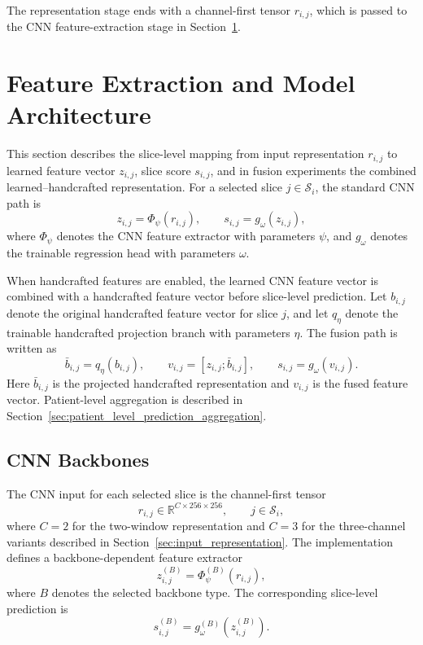 The representation stage ends with a channel-first tensor \(r_{i,j}\), which is passed to the CNN feature-extraction stage in Section~\ref{sec:feature_extraction_model_architecture}.


\section{Feature Extraction and Model Architecture}
\label{sec:feature_extraction_model_architecture}

This section describes the slice-level mapping from input representation \(r_{i,j}\) to learned feature vector \(z_{i,j}\), slice score \(s_{i,j}\), and in fusion experiments the combined learned--handcrafted representation. For a selected slice \(j \in \mathcal{S}_i\), the standard CNN path is
\[
z_{i,j}
=
\Phi_{\psi}(r_{i,j}),
\qquad
s_{i,j}
=
g_{\omega}(z_{i,j}),
\]
where \(\Phi_{\psi}\) denotes the CNN feature extractor with parameters \(\psi\), and \(g_{\omega}\) denotes the trainable regression head with parameters \(\omega\).

When handcrafted features are enabled, the learned CNN feature vector is combined with a handcrafted feature vector before slice-level prediction. Let \(b_{i,j}\) denote the original handcrafted feature vector for slice \(j\), and let \(q_{\eta}\) denote the trainable handcrafted projection branch with parameters \(\eta\). The fusion path is written as
\[
\bar{b}_{i,j}
=
q_{\eta}(b_{i,j}),
\qquad
v_{i,j}
=
\left[z_{i,j}; \bar{b}_{i,j}\right],
\qquad
s_{i,j}
=
g_{\omega}(v_{i,j}).
\]
Here \(\bar{b}_{i,j}\) is the projected handcrafted representation and \(v_{i,j}\) is the fused feature vector. Patient-level aggregation is described in Section~\ref{sec:patient_level_prediction_aggregation}.


\subsection{CNN Backbones}
\label{sec:cnn_backbones}

The CNN input for each selected slice is the channel-first tensor
\[
r_{i,j}
\in
\mathbb{R}^{C \times 256 \times 256},
\qquad
j \in \mathcal{S}_i,
\]
where \(C=2\) for the two-window representation and \(C=3\) for the three-channel variants described in Section~\ref{sec:input_representation}. The implementation defines a backbone-dependent feature extractor
\[
z_{i,j}^{(B)}
=
\Phi_{\psi}^{(B)}(r_{i,j}),
\]
where \(B\) denotes the selected backbone type. The corresponding slice-level prediction is
\[
s_{i,j}^{(B)}
=
g_{\omega}^{(B)}(z_{i,j}^{(B)}).
\]

